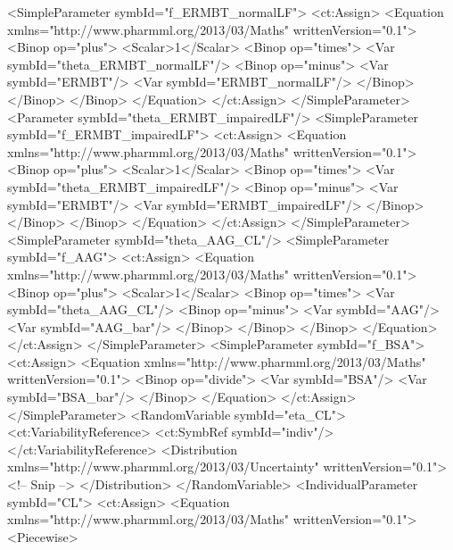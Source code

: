 \documentclass[a4paper,11pt]{article}
\begin{document}
\begin{xmlcode}
<SimpleParameter symbId="f_ERMBT_normalLF">
    <ct:Assign>
        <Equation xmlns="http://www.pharmml.org/2013/03/Maths" writtenVersion="0.1">
            <Binop op="plus">
                <Scalar>1</Scalar>
                <Binop op="times">
                    <Var symbId="theta_ERMBT_normalLF"/>
                    <Binop op="minus">
                        <Var symbId="ERMBT"/>
                        <Var symbId="ERMBT_normalLF"/>
                    </Binop>
                </Binop>
            </Binop>
        </Equation>
    </ct:Assign>
</SimpleParameter>
<Parameter symbId="theta_ERMBT_impairedLF"/>
<SimpleParameter symbId="f_ERMBT_impairedLF">
    <ct:Assign>
        <Equation xmlns="http://www.pharmml.org/2013/03/Maths" writtenVersion="0.1">
            <Binop op="plus">
                <Scalar>1</Scalar>
                <Binop op="times">
                    <Var symbId="theta_ERMBT_impairedLF"/>
                    <Binop op="minus">
                        <Var symbId="ERMBT"/>
                        <Var symbId="ERMBT_impairedLF"/>
                    </Binop>
                </Binop>
            </Binop>
        </Equation>
    </ct:Assign>
</SimpleParameter>
<SimpleParameter symbId="theta_AAG_CL"/>
<SimpleParameter symbId="f_AAG">
    <ct:Assign>
        <Equation xmlns="http://www.pharmml.org/2013/03/Maths" writtenVersion="0.1">
            <Binop op="plus">
                <Scalar>1</Scalar>
                <Binop op="times">
                    <Var symbId="theta_AAG_CL"/>
                    <Binop op="minus">
                        <Var symbId="AAG"/>
                        <Var symbId="AAG_bar"/>
                    </Binop>
                </Binop>
            </Binop>
        </Equation>
    </ct:Assign>
</SimpleParameter>
<SimpleParameter symbId="f_BSA">
    <ct:Assign>
        <Equation xmlns="http://www.pharmml.org/2013/03/Maths" writtenVersion="0.1">
            <Binop op="divide">
                <Var symbId="BSA"/>
                <Var symbId="BSA_bar"/>
            </Binop>
        </Equation>
    </ct:Assign>
</SimpleParameter>
<RandomVariable symbId="eta_CL">
    <ct:VariabilityReference>
        <ct:SymbRef symbId="indiv"/>
    </ct:VariabilityReference>
    <Distribution xmlns="http://www.pharmml.org/2013/03/Uncertainty"
    writtenVersion="0.1">
         <!-- Snip -->
    </Distribution>
</RandomVariable>
<IndividualParameter symbId="CL">
    <ct:Assign>
        <Equation xmlns="http://www.pharmml.org/2013/03/Maths" writtenVersion="0.1">
            <Piecewise>

\end{xmlcode}
\end{document}
